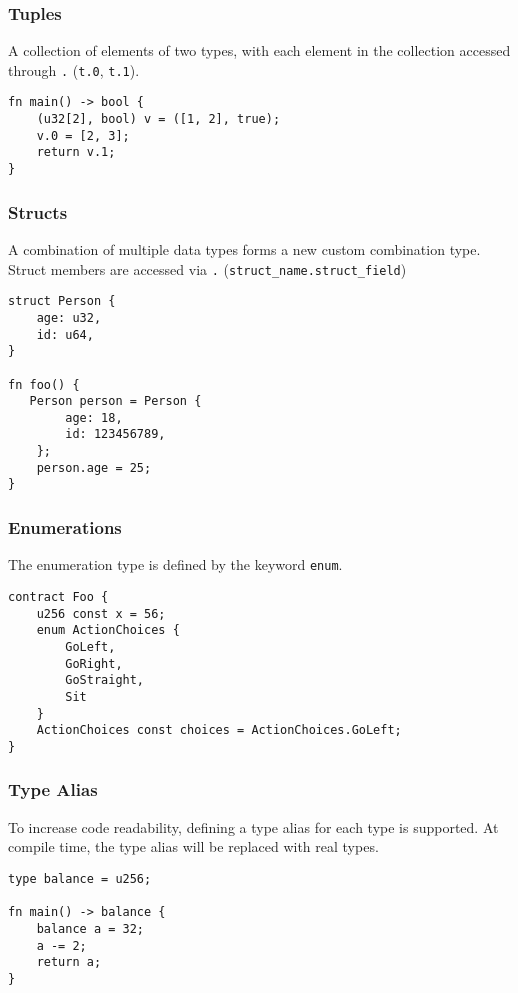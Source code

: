 \subsubsection*{Tuples}

A collection of elements of two types, with each element in the collection accessed through \texttt{.} (\texttt{t.0}, \texttt{t.1}).

\begin{lstlisting}
fn main() -> bool {
    (u32[2], bool) v = ([1, 2], true);
    v.0 = [2, 3];
    return v.1;
}
\end{lstlisting}

\subsubsection*{Structs}

A combination of multiple data types forms a new custom combination type. Struct members are accessed via \texttt{.} (\texttt{struct\_name.struct\_field})

\begin{lstlisting}
struct Person {
    age: u32,
    id: u64,
}

fn foo() {
   Person person = Person {
        age: 18,
        id: 123456789,
    };
    person.age = 25;
}
\end{lstlisting}

\subsubsection*{Enumerations}

The enumeration type is defined by the keyword \texttt{enum}.

\begin{lstlisting}
contract Foo {
    u256 const x = 56;
    enum ActionChoices {
        GoLeft,
        GoRight,
        GoStraight,
        Sit
    }
    ActionChoices const choices = ActionChoices.GoLeft;
}
\end{lstlisting}


\subsubsection*{Type Alias}

To increase code readability, defining a type alias for each type is supported. At compile time, the type alias will be replaced with real types.

\begin{lstlisting}
type balance = u256;

fn main() -> balance {
    balance a = 32;
    a -= 2;
    return a;
}
\end{lstlisting}

